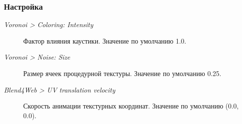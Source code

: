 \documentclass[a4paper,12pt,oneside]{sphinxmanual}
\begin{document}
\subsubsection{Настройка}
\label{outdoor_rendering:id16}\begin{figure}[htbp]
\centering

\end{figure}
\begin{description}
\item[{\emph{Voronoi \textgreater{} Coloring: Intensity}}] \leavevmode
Фактор влияния каустики. Значение по умолчанию 1.0.

\item[{\emph{Voronoi \textgreater{} Noise: Size}}] \leavevmode
Размер ячеек процедурной текстуры. Значение по умолчанию 0.25.

\item[{\emph{Blend4Web \textgreater{} UV translation velocity}}] \leavevmode
Скорость анимации текстурных координат. Значение по умолчанию (0.0, 0.0).

\end{description}
\end{document}
